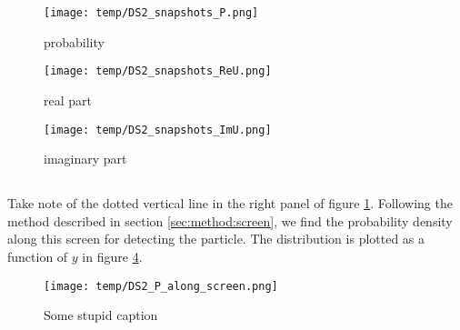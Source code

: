     \clearpage

    \newpage

    \onecolumngrid

    \begin{figure*}
        \centering
        \begin{subfigure}{0.92\textwidth}
            \texttt{[image: temp/DS2\_snapshots\_P.png]}
            \caption{probability}
            \label{fig:snapshots_p_DS2}
        \end{subfigure}
        \hfill
        \begin{subfigure}{0.92\textwidth}
            \texttt{[image: temp/DS2\_snapshots\_ReU.png]}
            \caption{real part}
            \label{fig:snapshots_ReU_DS2}
        \end{subfigure}
        \hfill
        \begin{subfigure}{0.92\textwidth}
            \texttt{[image: temp/DS2\_snapshots\_ImU.png]}
            \caption{imaginary part}
            \label{fig:snapshots_ImU_DS2}
        \end{subfigure}
        \caption{Colour maps showing }
        \label{fig:snapshots_DS2}
    \end{figure*}


    \twocolumngrid

\subsection{}

    Take note of the dotted vertical line in the right panel of figure \ref{fig:snapshots_p_DS2}. Following the method described in section \ref{sec:method:screen}, we find the probability density along this screen for detecting the particle.  The distribution is plotted as a function of $y$ in figure \ref{fig:p_along_y_DS2}.



    \begin{figure}[ht!]
        \centering
        \texttt{[image: temp/DS2\_P\_along\_screen.png]}
        \caption{Some stupid caption}
        \label{fig:p_along_y_DS2}
    \end{figure}


